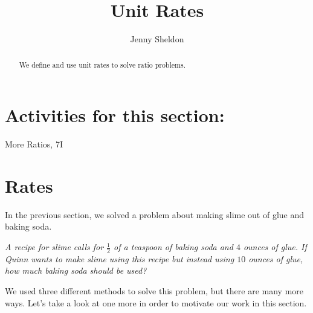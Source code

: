 \documentclass{ximera}
\title{Unit Rates}
\author{Jenny Sheldon}
\begin{document}
\begin{abstract}
We define and use unit rates to solve ratio problems.
\end{abstract}
\maketitle

\section{Activities for this section:} More Ratios, 7I

\section{Rates}

In the previous section, we solved a problem about making slime out of glue and baking soda.

\emph{A recipe for slime calls for $\frac{1}{2}$ of a teaspoon of baking soda and $4$ ounces of glue. If Quinn wants to make slime using this recipe but instead using $10$ ounces of glue, how much baking soda should be used?}

We used three different methods to solve this problem, but there are many more ways. Let's take a look at one more in order to motivate our work in this section.
\end{document}
